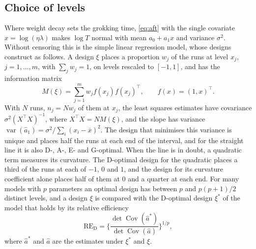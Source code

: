 \documentclass[a4paper,11pt]{article} %
\begin{document}
\subsection{Choice of levels}\label{sec:levels}

Where weight decay sets the grokking time, \eqref{eq:aft} with the single
covariate $x=\log(\eta\lambda)$ makes $\log T$ normal with mean $a_0+a_1x$ and
variance $\sigma^2$. Without censoring this is the simple linear regression
model, whose designs \citet{bergerIntroductionOptimalDesigns2009} construct as
follows. A design $\xi$ places a proportion $w_j$ of the runs at level $x_j$,
$j=1,\dots,m$, with $\sum_j w_j=1$, on levels rescaled to $[-1,1]$, and has the
information matrix
\begin{equation}
  M(\xi) = \sum_{j=1}^{m} w_j f(x_j)f(x_j)^\top ,\qquad f(x) = (1,x)^\top .
\end{equation}
With $N$ runs, $n_j=Nw_j$ of them at $x_j$, the least squares estimates have
covariance $\sigma^2(X^\top X)^{-1}$, where $X^\top X=N M(\xi)$, and the slope
has variance $\operatorname{var}(\hat a_1)=\sigma^2/\sum_i(x_i-\bar x)^2$. The
design that minimises this variance is unique and places half the runs at each
end of the interval, and for the straight line it is also D-, A-, E- and
G-optimal. When the line is in doubt, a quadratic term measures its curvature.
The D-optimal design for the quadratic places a third of the runs at each of
$-1$, $0$ and $1$, and the design for its curvature coefficient alone places
half of them at $0$ and a quarter at each end. For many models with $p$
parameters an optimal design has between $p$ and $p(p+1)/2$ distinct levels,
and a design $\xi$ is compared with the D-optimal design $\xi^*$ of the model
that holds by its relative efficiency
\begin{equation}
  \mathrm{RE}_{\mathrm{D}} = \biggl\{
    \frac{\det\operatorname{Cov}(\hat a^*)}{\det\operatorname{Cov}(\hat a)}
  \biggr\}^{1/p} ,
\end{equation}
where $\hat a^*$ and $\hat a$ are the estimates under $\xi^*$ and $\xi$.
\end{document}
